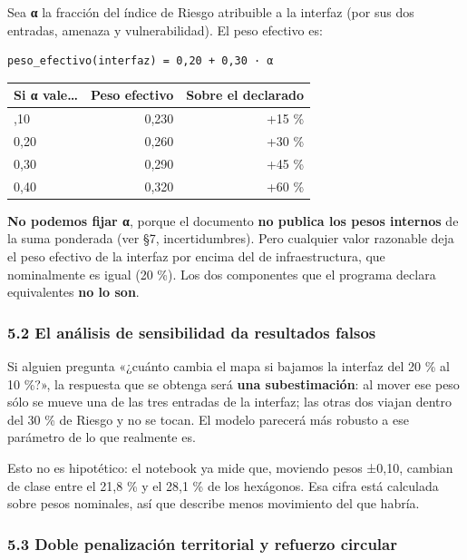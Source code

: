 \documentclass[
  spanish,
  10pt,
]{article}
\begin{document}
Sea \textbf{α} la fracción del índice de Riesgo atribuible a la interfaz
(por sus dos entradas, amenaza y vulnerabilidad). El peso efectivo es:

\begin{verbatim}
peso_efectivo(interfaz) = 0,20 + 0,30 · α
\end{verbatim}

\begin{longtable}[]{@{}lrr@{}}
\toprule\noalign{}
Si α vale\ldots{} & Peso efectivo & Sobre el declarado \\
\midrule\noalign{}
\endhead
\bottomrule\noalign{}
\endlastfoot
0,10 & 0,230 & +15 \% \\
0,20 & 0,260 & +30 \% \\
0,30 & 0,290 & +45 \% \\
0,40 & 0,320 & +60 \% \\
\end{longtable}

\textbf{No podemos fijar α}, porque el documento \textbf{no publica los
pesos internos} de la suma ponderada (ver §7, incertidumbres). Pero
cualquier valor razonable deja el peso efectivo de la interfaz por
encima del de infraestructura, que nominalmente es igual (20 \%). Los
dos componentes que el programa declara equivalentes \textbf{no lo son}.

\subsubsection{5.2 El análisis de sensibilidad da resultados
falsos}\label{el-anuxe1lisis-de-sensibilidad-da-resultados-falsos}

Si alguien pregunta «¿cuánto cambia el mapa si bajamos la interfaz del
20 \% al 10 \%?», la respuesta que se obtenga será \textbf{una
subestimación}: al mover ese peso sólo se mueve una de las tres entradas
de la interfaz; las otras dos viajan dentro del 30 \% de Riesgo y no se
tocan. El modelo parecerá más robusto a ese parámetro de lo que
realmente es.

Esto no es hipotético: el notebook ya mide que, moviendo pesos ±0,10,
cambian de clase entre el 21,8 \% y el 28,1 \% de los hexágonos. Esa
cifra está calculada sobre pesos nominales, así que describe menos
movimiento del que habría.

\subsubsection{5.3 Doble penalización territorial y refuerzo
circular}\label{doble-penalizaciuxf3n-territorial-y-refuerzo-circular}
\end{document}
